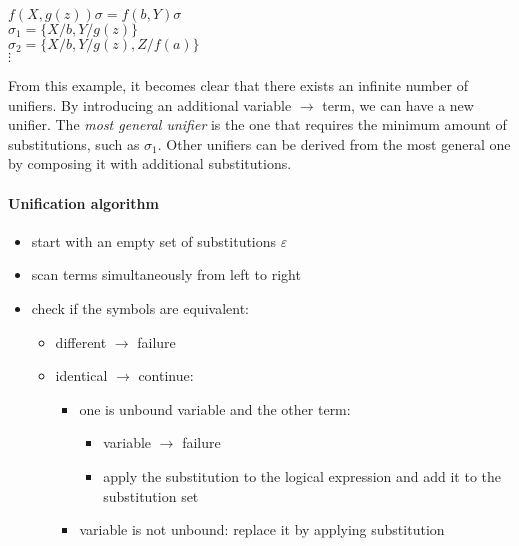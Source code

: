 \documentclass{article}
\begin{document}
\begin{example}
   $f(X,g(z))\sigma=f(b,Y)\sigma$\\
   $\sigma_1=\{X/b,Y/g(z)\}$\\
   $\sigma_2=\{X/b,Y/g(z),Z/f(a)\}$\\ 
   $\vdots$
\end{example}
From this example, it becomes clear that there exists an infinite number of
unifiers. By introducing an additional variable $\to$ term, we can have a new
unifier. The \textit{most general unifier} is the one that requires the minimum
amount of substitutions, such as $\sigma_1$. Other unifiers can be derived
from the most general one by composing it with additional substitutions.

\paragraph{Unification algorithm}
\begin{itemize}
    \item start with an empty set of substitutions $\varepsilon$
    \item scan terms simultaneously from left to right
    \item check if the symbols are equivalent:
        \begin{itemize}
            \item different $\to$ failure
            \item identical $\to$ continue:
                \begin{itemize}
                   \item one is unbound variable and the other term:
                       \begin{itemize}
                           \item variable $\to$ failure
                            \item apply the substitution to the logical
                                expression and add it to the substitution set
                       \end{itemize}
                    \item variable is not unbound: replace it by applying
                        substitution
                \end{itemize}
        \end{itemize}
\end{itemize}
\end{document}
